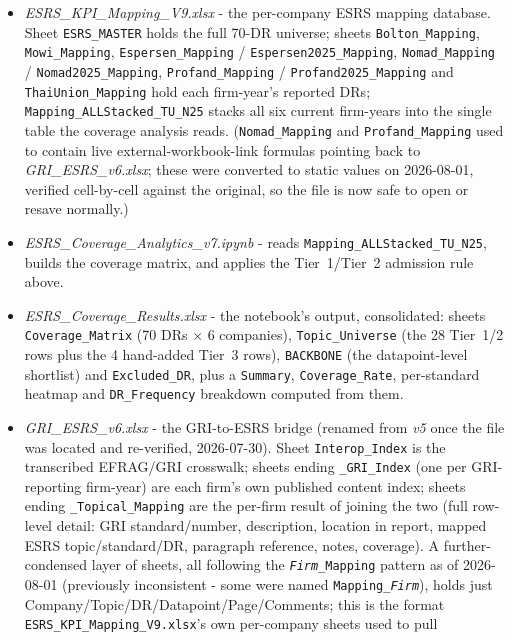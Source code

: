 \documentclass[
]{article}
\begin{document}
\begin{itemize}
\item \emph{ESRS\_KPI\_Mapping\_V9.xlsx} - the per-company ESRS mapping
  database. Sheet \texttt{ESRS\_MASTER} holds the full 70-DR universe;
  sheets \texttt{Bolton\_Mapping}, \texttt{Mowi\_Mapping},
  \texttt{Espersen\_Mapping} / \texttt{Espersen2025\_Mapping},
  \texttt{Nomad\_Mapping} / \texttt{Nomad2025\_Mapping},
  \texttt{Profand\_Mapping} / \texttt{Profand2025\_Mapping} and
  \texttt{ThaiUnion\_Mapping} hold each firm-year's reported DRs;
  \texttt{Mapping\_ALLStacked\_TU\_N25} stacks all six current firm-years into
  the single table the coverage analysis reads. (\texttt{Nomad\_Mapping} and
  \texttt{Profand\_Mapping} used to contain live external-workbook-link
  formulas pointing back to \emph{GRI\_ESRS\_v6.xlsx}; these were converted
  to static values on 2026-08-01, verified cell-by-cell against the original,
  so the file is now safe to open or resave normally.)
\item \emph{ESRS\_Coverage\_Analytics\_v7.ipynb} - reads
  \texttt{Mapping\_ALLStacked\_TU\_N25}, builds the coverage matrix, and
  applies the Tier~1/Tier~2 admission rule above.
\item \emph{ESRS\_Coverage\_Results.xlsx} - the notebook's output, consolidated:
  sheets \texttt{Coverage\_Matrix} (70 DRs $\times$ 6 companies), \texttt{Topic\_Universe}
  (the 28 Tier~1/2 rows plus the 4 hand-added Tier~3 rows), \texttt{BACKBONE}
  (the datapoint-level shortlist) and \texttt{Excluded\_DR}, plus a
  \texttt{Summary}, \texttt{Coverage\_Rate}, per-standard heatmap and
  \texttt{DR\_Frequency} breakdown computed from them.
\item \emph{GRI\_ESRS\_v6.xlsx} - the GRI-to-ESRS bridge (renamed from
  \emph{v5} once the file was located and re-verified, 2026-07-30). Sheet
  \texttt{Interop\_Index} is the transcribed EFRAG/GRI crosswalk;
  sheets ending \texttt{\_GRI\_Index} (one per GRI-reporting firm-year) are
  each firm's own published content index; sheets ending
  \texttt{\_Topical\_Mapping} are the per-firm result of joining the two
  (full row-level detail: GRI standard/number, description, location in
  report, mapped ESRS topic/standard/DR, paragraph reference, notes,
  coverage). A further-condensed layer of sheets, all following the
  \texttt{\emph{Firm}\_Mapping} pattern as of 2026-08-01 (previously
  inconsistent - some were named \texttt{Mapping\_\emph{Firm}}), holds
  just Company/Topic/DR/Datapoint/Page/Comments; this is the format
  \texttt{ESRS\_KPI\_Mapping\_V9.xlsx}'s own per-company sheets used to pull

\end{itemize}
\end{document}
